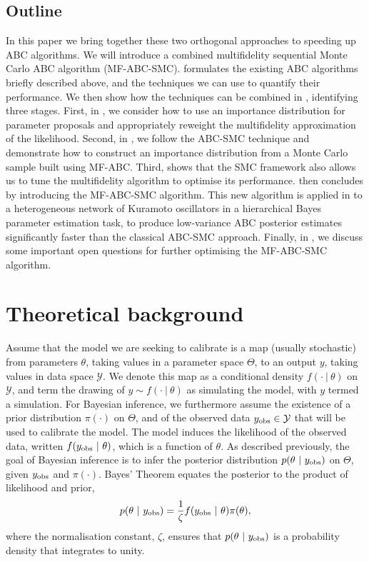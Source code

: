 \documentclass[review]{siamonline190516}
\begin{document}
\subsection{Outline}
\label{s:Outline}
In this paper we bring together these two orthogonal approaches to speeding up ABC algorithms.
We will introduce a combined multifidelity sequential Monte Carlo ABC algorithm (MF-ABC-SMC).
 formulates the existing ABC algorithms briefly described above, and the techniques we can use to quantify their performance.
We then show how the techniques can be combined in , identifying three stages.
First, in , we consider how to use an importance distribution for parameter proposals and appropriately reweight the multifidelity approximation of the likelihood.
Second, in , we follow the ABC-SMC technique and demonstrate how to construct an importance distribution from a Monte Carlo sample built using MF-ABC.
Third,  shows that the SMC framework also allows us to tune the multifidelity algorithm to optimise its performance.
 then concludes by introducing the MF-ABC-SMC algorithm. 
This new algorithm is applied in  to a heterogeneous network of Kuramoto oscillators in a hierarchical Bayes parameter estimation task, to produce low-variance ABC posterior estimates significantly faster than the classical ABC-SMC approach.
Finally, in , we discuss some important open questions for further optimising the MF-ABC-SMC algorithm.

\section{Theoretical background}
\label{s:Background}

Assume that the model we are seeking to calibrate is a map (usually stochastic) from parameters $\theta$, taking values in a parameter space $\Theta$, to an output $y$, taking values in data space $\mathcal Y$.
We denote this map as a conditional density $f(\cdot~|~\theta)$ on $\mathcal Y$, and term the drawing of $y \sim f(\cdot~|~\theta)$ as simulating the model, with $y$ termed a simulation.
For Bayesian inference, we furthermore assume the existence of a prior distribution $\pi(\cdot)$ on $\Theta$, and of the observed data $y_{\mathrm{obs}} \in \mathcal Y$ that will be used to calibrate the model.
The model induces the likelihood of the observed data, written $f(y_{\mathrm{obs}}~|~\theta)$, which is a function of $\theta$.
As described previously, the goal of Bayesian inference is to infer the posterior distribution $p(\theta~|~y_{\mathrm{obs}})$ on $\Theta$, given $y_{\mathrm{obs}}$ and $\pi(\cdot)$.
Bayes' Theorem equates the posterior to the product of likelihood and prior,
\[
p( \theta ~|~ y_{\mathrm{obs}}) = \frac{1}{\zeta} f(y_{\mathrm{obs}}~|~\theta) \pi(\theta),
\]
where the normalisation constant, $\zeta$, ensures that $p(\theta~|~y_{\mathrm{obs}})$ is a probability density that integrates to unity.
\end{document}
